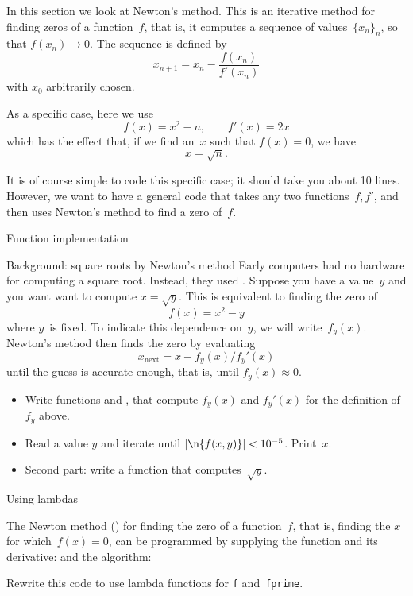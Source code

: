 In this section we look at Newton's method.
This is an iterative method for finding zeros of a function~$f$,
that is, it computes a sequence of values~$\{x_n\}_n$,
so that $f(x_n)\rightarrow 0$.
The sequence is defined by
\[ x_{n+1} = x_n - \frac{f(x_n)}{f'(x_n)} \]
with $x_0$ arbitrarily chosen.

As a specific case, here we use
\[ f(x)=x^2-n,\qquad f'(x)=2x \]
which has the effect that,
if we find an~$x$ such that $f(x)=0$, we have
\[ x=\sqrt n. \]

It is of course simple to code this specific case;
it should take you about 10 lines.
However, we want to have a general code
that takes any two functions~$f,f'$,
and then uses Newton's method to find a zero of~$f$.

 {Function implementation}

\begin{block}{Background: square roots by Newton's method}
  \label{sl:newton-root}
  Early computers had no hardware for computing a square
  root. Instead, they used . Suppose you
  have a value~$y$ and you want want to compute
  $x=\sqrt{y}$. This is equivalent to finding the zero of
  \[ f(x) = x^2-y \] where $y$~is fixed. To indicate this dependence
  on~$y$, we will write~$f_y(x)$. Newton's method then finds the zero by
  evaluating
  \[ x_{\mathrm{next}}=x-f_y(x)/f_y'(x) \]
  until the guess is accurate enough, that is, until $f_y(x)\approx0$.
\end{block}

\begin{exercise}
  \label{ex:newton-root}
  \begin{itemize}
  \item Write functions  and , that compute
    $f_y(x)$ and $f_y'(x)$ for the definition of $f_y$ above.
  \item Read a value $y$ and iterate until $|\n{f(x,y)}|<10^{-5}$. Print~$x$.
  \item Second part: write a function  that computes~$\sqrt{y}$.
  \end{itemize}
\end{exercise}

 {Using lambdas}

\begin{exercise}
  \label{ex:newton-functions}
  The Newton method () for finding the zero of a function~$f$,
  that is, finding the $x$ for which~$f(x)=0$,
  can be programmed by supplying the function and its derivative:
  and the algorithm:

  Rewrite this code to use lambda functions for \lstinline{f} and~\lstinline{fprime}.
\end{exercise}

